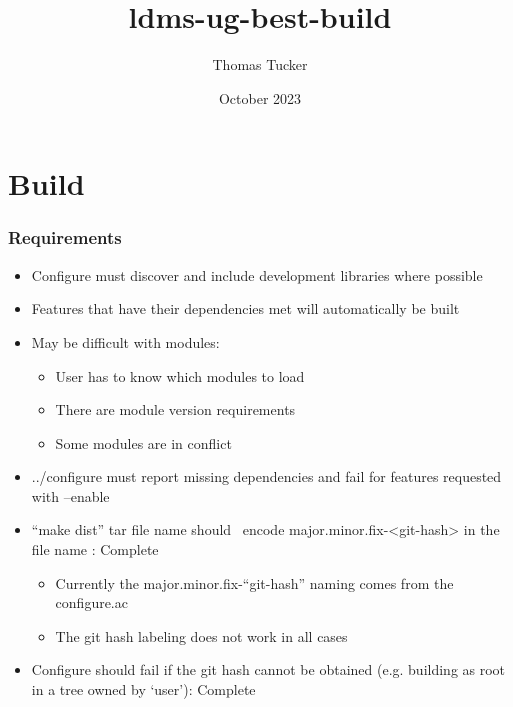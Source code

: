 \documentclass{article}
\title{ldms-ug-best-build}
\author{Thomas Tucker}
\date{October 2023}
\begin{document}
\section{Build}
\subsubsection{Requirements}

\begin{itemize}
    \item Configure must discover and include development libraries where possible
    \item Features that have their dependencies met will automatically be built
    \item May be difficult with modules:
        \begin{itemize}
            \item User has to know which modules to load
            \item There are module version requirements
            \item Some modules are in conflict
        \end{itemize}
    \item ../configure must report missing dependencies and fail for features requested with –enable
    \item “make dist” tar file name should  encode major.minor.fix-<git-hash> in the file name : Complete
        \begin{itemize}
            \item Currently the major.minor.fix-``git-hash'' naming comes from the configure.ac
            \item The git hash labeling does not work in all cases
        \end{itemize}
    \item Configure should fail if the git hash cannot be obtained (e.g. building as root in a tree owned by ‘user’): Complete
        
\end{itemize}
\end{document}
